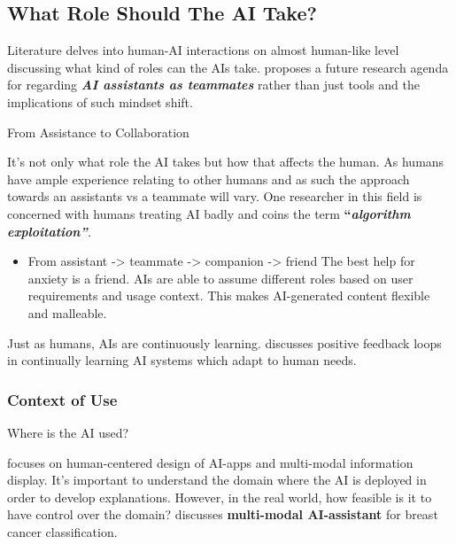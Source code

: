 \documentclass[
  letterpaper,
  DIV=11,
  numbers=noendperiod]{scrartcl}
\providecommand{\tightlist}{%
  \setlength{\itemsep}{0pt}\setlength{\parskip}{0pt}}\usepackage{longtable,booktabs,array}
\begin{document}
\subsection{What Role Should The AI
Take?}\label{what-role-should-the-ai-take}

Literature delves into human-AI interactions on almost human-like level
discussing what kind of roles can the AIs take.
\citep{seeberMachinesTeammatesResearch2020} proposes a future research
agenda for regarding \textbf{\emph{AI assistants as teammates}} rather
than just tools and the implications of such mindset shift.

From Assistance to Collaboration

It's not only what role the AI takes but how that affects the human. As
humans have ample experience relating to other humans and as such the
approach towards an assistants vs a teammate will vary. One researcher
in this field \citet{karpusAlgorithmExploitationHumans2021} is concerned
with humans treating AI badly and coins the term
\textbf{``\emph{algorithm exploitation''}}\emph{.}

\begin{itemize}
\tightlist
\item
  From assistant -\textgreater{} teammate -\textgreater{} companion
  -\textgreater{} friend The best help for anxiety is a friend. AIs are
  able to assume different roles based on user requirements and usage
  context. This makes AI-generated content flexible and malleable.
\end{itemize}

Just as humans, AIs are continuously learning.
\citet{ramchurnTrustworthyHumanAIPartnerships2021} discusses positive
feedback loops in continually learning AI systems which adapt to human
needs.

\subsubsection{Context of Use}\label{context-of-use}

Where is the AI used?

\citet{schoonderwoerdHumancenteredXAIDeveloping2021} focuses on
human-centered design of AI-apps and multi-modal information display.
It's important to understand the domain where the AI is deployed in
order to develop explanations. However, in the real world, how feasible
is it to have control over the domain?
\citet{calistoIntroductionHumancentricAI2021} discusses
\textbf{multi-modal AI-assistant} for breast cancer classification.
\end{document}
